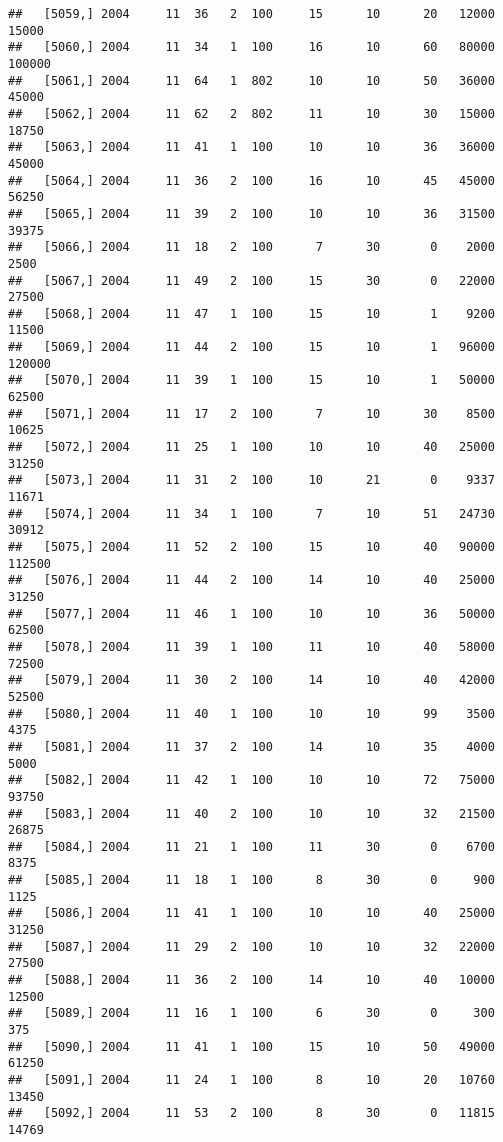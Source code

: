\documentclass{article}\usepackage[]{graphicx}\usepackage[]{color}
\makeatletter
\newenvironment{kframe}{%
 \def\at@end@of@kframe{}%
 \ifinner\ifhmode%
  \def\at@end@of@kframe{\end{minipage}}%
  \begin{minipage}{\columnwidth}%
 \fi\fi%
 \def\FrameCommand##1{\hskip\@totalleftmargin \hskip-\fboxsep
 \colorbox{shadecolor}{##1}\hskip-\fboxsep
     \hskip-\linewidth \hskip-\@totalleftmargin \hskip\columnwidth}%
 \MakeFramed {\advance\hsize-\width
   \@totalleftmargin\z@ \linewidth\hsize
   \@setminipage}}%
 {\par\unskip\endMakeFramed%
 \at@end@of@kframe}
\newenvironment{knitrout}{}{} %
\makeatother
\begin{document}
\begin{knitrout}
\begin{kframe}
\begin{verbatim}
##   [5059,] 2004     11  36   2  100     15      10      20   12000   15000
##   [5060,] 2004     11  34   1  100     16      10      60   80000  100000
##   [5061,] 2004     11  64   1  802     10      10      50   36000   45000
##   [5062,] 2004     11  62   2  802     11      10      30   15000   18750
##   [5063,] 2004     11  41   1  100     10      10      36   36000   45000
##   [5064,] 2004     11  36   2  100     16      10      45   45000   56250
##   [5065,] 2004     11  39   2  100     10      10      36   31500   39375
##   [5066,] 2004     11  18   2  100      7      30       0    2000    2500
##   [5067,] 2004     11  49   2  100     15      30       0   22000   27500
##   [5068,] 2004     11  47   1  100     15      10       1    9200   11500
##   [5069,] 2004     11  44   2  100     15      10       1   96000  120000
##   [5070,] 2004     11  39   1  100     15      10       1   50000   62500
##   [5071,] 2004     11  17   2  100      7      10      30    8500   10625
##   [5072,] 2004     11  25   1  100     10      10      40   25000   31250
##   [5073,] 2004     11  31   2  100     10      21       0    9337   11671
##   [5074,] 2004     11  34   1  100      7      10      51   24730   30912
##   [5075,] 2004     11  52   2  100     15      10      40   90000  112500
##   [5076,] 2004     11  44   2  100     14      10      40   25000   31250
##   [5077,] 2004     11  46   1  100     10      10      36   50000   62500
##   [5078,] 2004     11  39   1  100     11      10      40   58000   72500
##   [5079,] 2004     11  30   2  100     14      10      40   42000   52500
##   [5080,] 2004     11  40   1  100     10      10      99    3500    4375
##   [5081,] 2004     11  37   2  100     14      10      35    4000    5000
##   [5082,] 2004     11  42   1  100     10      10      72   75000   93750
##   [5083,] 2004     11  40   2  100     10      10      32   21500   26875
##   [5084,] 2004     11  21   1  100     11      30       0    6700    8375
##   [5085,] 2004     11  18   1  100      8      30       0     900    1125
##   [5086,] 2004     11  41   1  100     10      10      40   25000   31250
##   [5087,] 2004     11  29   2  100     10      10      32   22000   27500
##   [5088,] 2004     11  36   2  100     14      10      40   10000   12500
##   [5089,] 2004     11  16   1  100      6      30       0     300     375
##   [5090,] 2004     11  41   1  100     15      10      50   49000   61250
##   [5091,] 2004     11  24   1  100      8      10      20   10760   13450
##   [5092,] 2004     11  53   2  100      8      30       0   11815   14769

\end{verbatim}
\end{kframe}
\end{knitrout}
\end{document}
